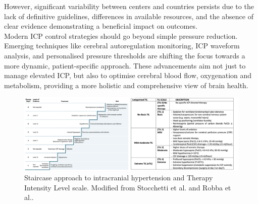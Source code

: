 However, significant variability between centers and countries persists due to the lack of definitive guidelines, differences in available resources, and the absence of clear evidence demonstrating a beneficial impact on outcomes\cite{robbaTreatmentsIntracranialHypertension2023a}.\\

Modern ICP control strategies should go beyond simple pressure reduction. Emerging techniques like cerebral autoregulation monitoring, ICP waveform analysis, and personalised pressure thresholds are shifting the focus towards a more dynamic, patient-specific approach. These advancements aim not just to manage elevated ICP, but also to optimise cerebral blood flow, oxygenation and metabolism, providing a more holistic and comprehensive view of brain health.

\begin{figure}[h]
    \centering
    \includegraphics[width=1\textwidth]{pictures/fig4.png}
    \caption{Staircase approach to intracranial hypertension and Therapy Intensity Level scale. Modified from Stocchetti et al.\cite{stocchettiTraumaticIntracranialHypertension2014a} and Robba et al.\cite{robbaTreatmentsIntracranialHypertension2023a}.}
\end{figure}

